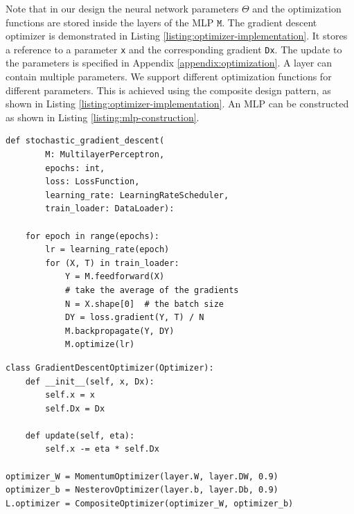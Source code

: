 \documentclass[twoside,11pt]{article}
\begin{document}
Note that in our design the neural network parameters $\Theta$ and the optimization functions are stored inside the layers of the MLP $\texttt{M}$. The gradient descent optimizer is
demonstrated in Listing \ref{listing:optimizer-implementation}. It stores a reference to a
parameter \texttt{x} and the corresponding gradient \texttt{Dx}. The update to the parameters is specified in Appendix \ref{appendix:optimization}. A layer can contain multiple parameters.
We support different optimization functions for different parameters. This is achieved using the composite design pattern, as shown in Listing \ref{listing:optimizer-implementation}.
An MLP can be constructed as shown in Listing \ref{listing:mlp-construction}.

\begin{lstfloat}[!ht]
\begin{lstlisting}
def stochastic_gradient_descent(
        M: MultilayerPerceptron,
        epochs: int,
        loss: LossFunction,
        learning_rate: LearningRateScheduler,
        train_loader: DataLoader):

    for epoch in range(epochs):
        lr = learning_rate(epoch)
        for (X, T) in train_loader:
            Y = M.feedforward(X)
            # take the average of the gradients
            N = X.shape[0]  # the batch size
            DY = loss.gradient(Y, T) / N
            M.backpropagate(Y, DY)
            M.optimize(lr)
\end{lstlisting}
\caption{A minimal implementation of stochastic gradient descent in NumPy.}
\label{listing:stochastic-gradient-descent}
\end{lstfloat}

\begin{lstfloat}[!ht]
\begin{lstlisting}
class GradientDescentOptimizer(Optimizer):
    def __init__(self, x, Dx):
        self.x = x
        self.Dx = Dx

    def update(self, eta):
        self.x -= eta * self.Dx

optimizer_W = MomentumOptimizer(layer.W, layer.DW, 0.9)
optimizer_b = NesterovOptimizer(layer.b, layer.Db, 0.9)
L.optimizer = CompositeOptimizer(optimizer_W, optimizer_b)
\end{lstlisting}
\caption{Optimizer Implementation. An optimizer stores references to a parameter \texttt{x} and its gradient \texttt{Dx} with respect to the loss function. Optimizers for multiple parameters are joined using the composite design pattern. The method \texttt{update} performs the actual optimization step.
The parameter \texttt{eta} is the step size or learning rate, and \texttt{L} is an instance of a \texttt{Layer}.
}
\label{listing:optimizer-implementation}
\end{lstfloat}
\end{document}
